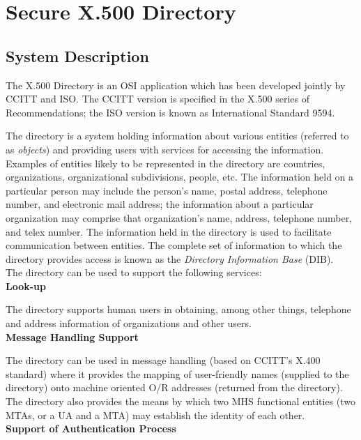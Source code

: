 \section{Secure X.500 Directory}
\thispagestyle{myheadings}
\label{ds}
\subsection{System Description}
The X.500 Directory is an OSI application which has been developed
jointly by CCITT and ISO. The CCITT version is specified in the
X.500 series of Recommendations; the ISO version is known as
International Standard 9594.

The directory is a system holding information about various entities
(referred to as {\em objects}) and providing users with services for
accessing the information. Examples of entities likely to be
represented in the directory are countries, organizations,
organizational subdivisions, people, etc.
The information held on a particular person may include the
person's name, postal address, telephone number, and electronic mail
address; the information about a particular organization may
comprise that organization's name, address, telephone number, and
telex number.
The information held in the directory is used to facilitate communication
between entities.
The complete set of information to which the directory provides
access is known as the {\em Directory Information Base} (DIB).
\\ [1em]
The directory can be used to support the following services:
\\ [1em]
{\bf Look-up}

The directory supports human users in obtaining, among other things,
telephone and address information of organizations and other users.
\\ [1em]
{\bf Message Handling Support}

The directory can be used in message handling (based on CCITT's
X.400 standard) where it provides the mapping of user-friendly names
(supplied to the directory) onto machine oriented O/R addresses
(returned from the directory). The directory also provides the means
by which two MHS functional entities (two MTAs, or a UA and a MTA)
may establish the identity of each other.
\\ [1em]
{\bf Support of Authentication Process}

